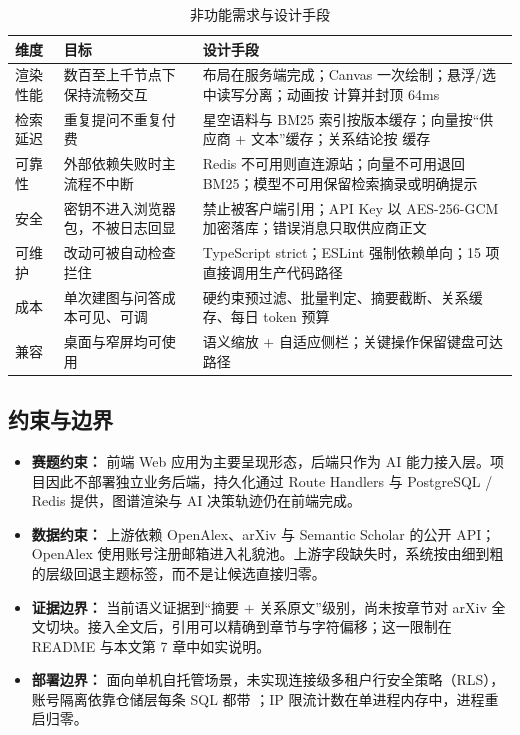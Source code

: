 \begin{table}[H]
  \centering
  \footnotesize
  \renewcommand{\arraystretch}{1.12}
  \caption{非功能需求与设计手段}
  \label{tab:nfr}
  \begin{tabularx}{\textwidth}{L{2.2cm}L{5.6cm}Y}
    \toprule
\textbf{维度} & \textbf{目标} & \textbf{设计手段} \\
    \midrule
    渲染性能 & 数百至上千节点下保持流畅交互 & 布局在服务端完成；Canvas 一次绘制；悬浮/选中读写分离；动画按  计算并封顶 64ms \\
    检索延迟 & 重复提问不重复付费 & 星空语料与 BM25 索引按版本缓存；向量按“供应商 + 文本”缓存；关系结论按  缓存 \\
    可靠性 & 外部依赖失败时主流程不中断 & Redis 不可用则直连源站；向量不可用退回 BM25；模型不可用保留检索摘录或明确提示 \\
    安全 & 密钥不进入浏览器包，不被日志回显 &  禁止被客户端引用；API Key 以 AES-256-GCM 加密落库；错误消息只取供应商正文 \\
    可维护 & 改动可被自动检查拦住 & TypeScript strict；ESLint 强制依赖单向；15 项  直接调用生产代码路径 \\
    成本 & 单次建图与问答成本可见、可调 & 硬约束预过滤、批量判定、摘要截断、关系缓存、每日 token 预算 \\
    兼容 & 桌面与窄屏均可使用 & 语义缩放 + 自适应侧栏；关键操作保留键盘可达路径 \\
    \bottomrule
  \end{tabularx}
\end{table}

\subsection{约束与边界}

\begin{itemize}
  \item \textbf{赛题约束：} 前端 Web 应用为主要呈现形态，后端只作为 AI 能力接入层。项目因此不部署独立业务后端，持久化通过 Route Handlers 与 PostgreSQL / Redis 提供，图谱渲染与 AI 决策轨迹仍在前端完成。
  \item \textbf{数据约束：} 上游依赖 OpenAlex、arXiv 与 Semantic Scholar 的公开 API；OpenAlex 使用账号注册邮箱进入礼貌池。上游字段缺失时，系统按由细到粗的层级回退主题标签，而不是让候选直接归零。
  \item \textbf{证据边界：} 当前语义证据到“摘要 + 关系原文”级别，尚未按章节对 arXiv 全文切块。接入全文后，引用可以精确到章节与字符偏移；这一限制在 README 与本文第 7 章中如实说明。
  \item \textbf{部署边界：} 面向单机自托管场景，未实现连接级多租户行安全策略（RLS），账号隔离依靠仓储层每条 SQL 都带 ；IP 限流计数在单进程内存中，进程重启归零。
\end{itemize}
